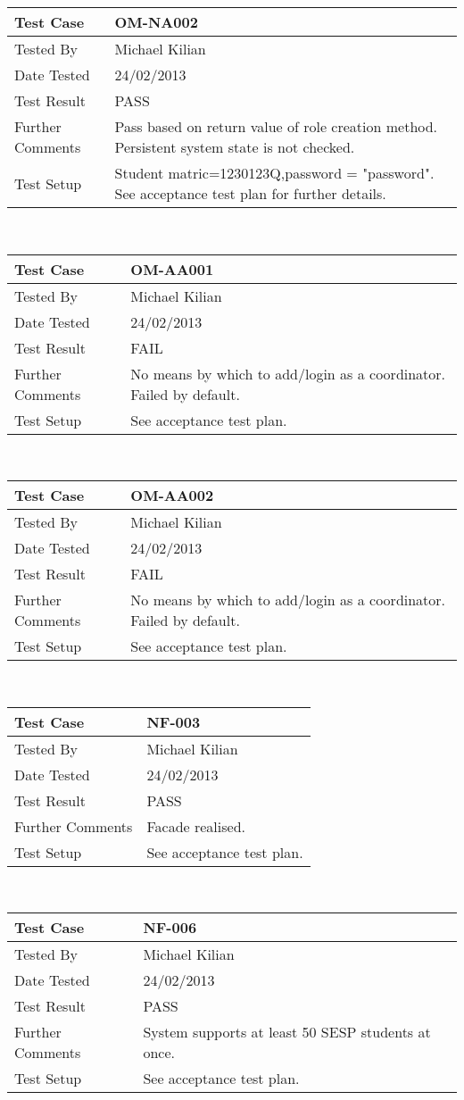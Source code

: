 \documentclass{l3deliverable}
\begin{document}
\begin{tabular}{lp{10cm}}
\hline 
\textbf{Test Case} & OM-NA002\tabularnewline
\hline 
\hline 
Tested By & Michael Kilian\tabularnewline
\hline 
Date Tested & 24/02/2013\tabularnewline
\hline 
Test Result & PASS\tabularnewline
\hline
Further Comments & Pass based on return value of role creation method. Persistent system state is not checked. \tabularnewline
\hline
Test Setup & Student matric=1230123Q,password = "password". See acceptance test plan for further details.\tabularnewline
\hline
\end{tabular}\\

\begin{tabular}{lp{10cm}}
\hline 
\textbf{Test Case} & OM-AA001\tabularnewline
\hline 
\hline 
Tested By & Michael Kilian\tabularnewline
\hline 
Date Tested & 24/02/2013\tabularnewline
\hline 
Test Result & FAIL\tabularnewline
\hline
Further Comments & No means by which to add/login as a coordinator. Failed by default.\tabularnewline
\hline
Test Setup & See acceptance test plan.\tabularnewline
\hline
\end{tabular}\\

\begin{tabular}{lp{10cm}}
\hline 
\textbf{Test Case} & OM-AA002\tabularnewline
\hline 
\hline 
Tested By & Michael Kilian\tabularnewline
\hline 
Date Tested & 24/02/2013\tabularnewline
\hline 
Test Result & FAIL\tabularnewline
\hline
Further Comments & No means by which to add/login as a coordinator. Failed by default.\tabularnewline
\hline
Test Setup & See acceptance test plan.\tabularnewline
\hline
\end{tabular}\\


\begin{tabular}{lp{10cm}}
\hline 
\textbf{Test Case} & NF-003\tabularnewline
\hline 
\hline 
Tested By & Michael Kilian\tabularnewline
\hline 
Date Tested & 24/02/2013\tabularnewline
\hline 
Test Result & PASS\tabularnewline
\hline
Further Comments & Facade realised.\tabularnewline
\hline
Test Setup & See acceptance test plan.\tabularnewline
\hline
\end{tabular}\\

\begin{tabular}{lp{10cm}}
\hline 
\textbf{Test Case} & NF-006\tabularnewline
\hline 
\hline 
Tested By & Michael Kilian\tabularnewline
\hline 
Date Tested & 24/02/2013\tabularnewline
\hline 
Test Result & PASS\tabularnewline
\hline
Further Comments & System supports at least 50 SESP students at once.\tabularnewline
\hline
Test Setup & See acceptance test plan.\tabularnewline
\hline
\end{tabular}\\
\end{document}

